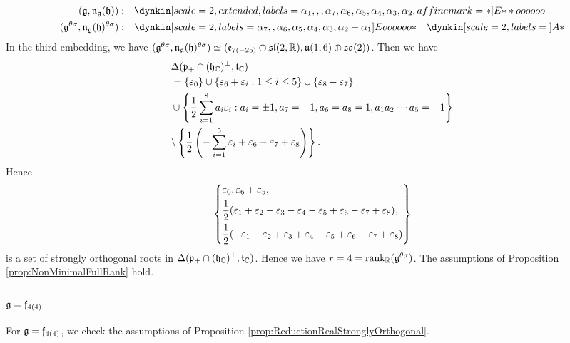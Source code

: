 \begin{align*}
	(\lie{g}, \lieNorm_{\lie{g}}(\lie{h})): \quad & \dynkin[scale=2, extended, labels={\alpha_1, , , \alpha_7, \alpha_6, \alpha_5, \alpha_4, \alpha_3, \alpha_2}, affine mark=*]{E}{**oooooo} \\
	(\lie{g}^{\theta\sigma}, \lieNorm_{\lie{g}}(\lie{h})^{\theta\sigma}): \quad & \dynkin[scale=2, labels={\alpha_7, , \alpha_6, \alpha_5, \alpha_4, \alpha_3, \alpha_2 + \alpha_1}]{E}{oooooo*}
	\quad \dynkin[scale=2, labels={}]{A}{*}
\end{align*}
In the third embedding, we have $(\mathfrak{g}^{\theta\sigma}, \mathfrak{n}_{\mathfrak{g}}(\mathfrak{h})^{\theta\sigma}) \simeq (\mathfrak{e}_{7(-25)} \oplus \mathfrak{sl}(2,\mathbb{R}), \mathfrak{u}(1, 6) \oplus \mathfrak{so}(2))$.
Then we have
\begin{align*}
	&\Delta(\mathfrak{p}_+ \cap (\mathfrak{h}_{\mathbb{C}})^\perp, \mathfrak{t}_{\mathbb{C}}) \\
	&= \left\{\varepsilon_0 \right\} \cup \left\{\varepsilon_6 + \varepsilon_i: 1\leq i \leq 5 \right\} \cup \left\{\varepsilon_8 - \varepsilon_7 \right\} \\
	&\cup \left\{\frac{1}{2}\sum_{i=1}^8 a_i \varepsilon_i: a_i = \pm 1, a_7=-1,a_6=a_8=1,a_1a_2\cdots a_5 = -1 \right\}\\
	&\backslash \left\{\frac{1}{2}\left(-\sum_{i=1}^5 \varepsilon_i + \varepsilon_6 - \varepsilon_7 + \varepsilon_8\right) \right\}.
\end{align*}
Hence
\begin{align*}
	\left\{\begin{aligned}
		&\varepsilon_0, \varepsilon_6 + \varepsilon_5,\\
		&\frac{1}{2}(\varepsilon_1 + \varepsilon_2 - \varepsilon_3 - \varepsilon_4 - \varepsilon_5 + \varepsilon_6 - \varepsilon_7 + \varepsilon_8), \\
		&\frac{1}{2}(-\varepsilon_1 - \varepsilon_2 + \varepsilon_3 + \varepsilon_4 - \varepsilon_5 + \varepsilon_6 - \varepsilon_7 + \varepsilon_8)
	\end{aligned} \right\}
\end{align*}
is a set of strongly orthogonal roots in $\Delta(\mathfrak{p}_+ \cap (\mathfrak{h}_{\mathbb{C}})^\perp, \mathfrak{t}_{\mathbb{C}})$.
Hence we have $r = 4 = \operatorname{rank}_{\mathbb{R}}(\mathfrak{g}^{\theta\sigma})$.
The assumptions of Proposition \ref{prop:NonMinimalFullRank} hold.

\subsubsection{\texorpdfstring{$\mathfrak{g} = \mathfrak{f}_{4(4)}$}{g=F4(4)}}

For $\mathfrak{g} = \mathfrak{f}_{4(4)}$, we check the assumptions of Proposition \ref{prop:ReductionRealStronglyOrthogonal}.

